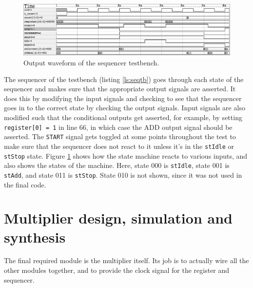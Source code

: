 \documentclass[a4paper,11pt]{article}
\begin{document}
\begin{figure}[H]
    \centering
        \includegraphics[scale=0.65]{../out/sequencer_tb.eps}
    \caption{Output waveform of the sequencer testbench.}
    \label{fig:seqtbw}
\end{figure}

The sequencer of the testbench (listing \ref{ls:seqtb}) goes through each state of the sequencer and makes sure that the appropriate output signals are asserted. It does this by modifying the input signals and checking to see that the sequencer goes in to the correct state by checking the output signals. Input signals are also modified such that the conditional outputs get asserted, for example, by setting \lstinline{register[0] = 1} in line 66, in which case the ADD output signal should be asserted. The \lstinline{START} signal gets toggled at some points throughout the test to make sure that the sequencer does not react to it unless it's in the \lstinline{stIdle} or \lstinline{stStop} state. Figure \ref{fig:seqtbw} shows how the state machine reacts to various inputs, and also shows the states of the machine. Here, state 000 is \lstinline{stIdle}, state 001 is \lstinline{stAdd}, and state 011 is \lstinline{stStop}. State 010 is not shown, since it was not used in the final code.

\section{Multiplier design, simulation and synthesis}

The final required module is the multiplier itself. Its job is to actually wire all the other modules together, and to provide the clock signal for the register and sequencer.
\end{document}
